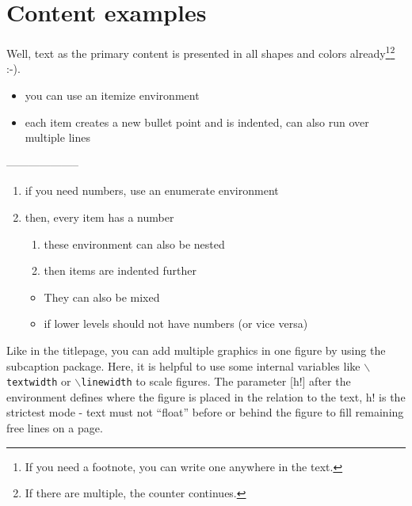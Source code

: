 \section{Content examples}
%
Well, text as the primary content is presented in all shapes and colors already\footnote{If you need a footnote, you can write one anywhere in the text.}\footnote{If there are multiple, the counter continues.} :-).
%
\begin{itemize}
	\item you can use an itemize environment
	\item each item creates a new bullet point and is indented, can also run over multiple lines
\end{itemize}
%
--------------------\\
%
\begin{enumerate}
	\item if you need numbers, use an enumerate environment
	\item then, every item has a number
	\begin{enumerate}
		\item these environment can also be nested
		\item then items are indented further
	\end{enumerate}
	\begin{itemize}
		\item They can also be mixed
		\item if lower levels should not have numbers (or vice versa)
	\end{itemize}
\end{enumerate}
%
Like in the titlepage, you can add multiple graphics in one figure by using the subcaption package. Here, it is helpful to use some internal variables like \texttt{$\backslash$textwidth} or \texttt{$\backslash$linewidth} to scale figures. The parameter [h!] after the environment defines where the figure is placed in the relation to the text, h! is the strictest mode - text must not ``float'' before or behind the figure to fill remaining free lines on a page.
